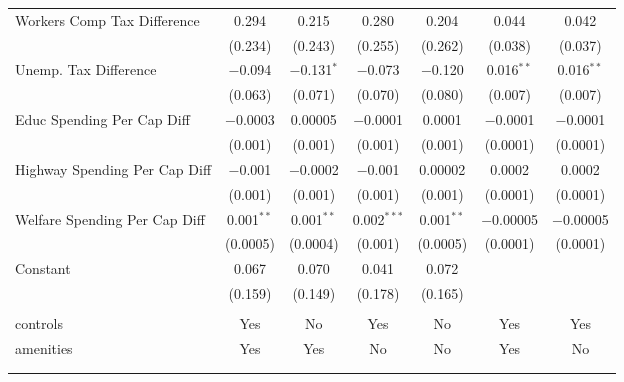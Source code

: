 \begin{table}[!htbp]
\begin{tabular}{@{\extracolsep{5pt}}lcccccc}
  Workers Comp Tax Difference & 0.294 & 0.215 & 0.280 & 0.204 & 0.044 & 0.042 \\ 
  & (0.234) & (0.243) & (0.255) & (0.262) & (0.038) & (0.037) \\ 
  Unemp. Tax Difference & $-$0.094 & $-$0.131$^{*}$ & $-$0.073 & $-$0.120 & 0.016$^{**}$ & 0.016$^{**}$ \\ 
  & (0.063) & (0.071) & (0.070) & (0.080) & (0.007) & (0.007) \\ 
  Educ Spending Per Cap Diff & $-$0.0003 & 0.00005 & $-$0.0001 & 0.0001 & $-$0.0001 & $-$0.0001 \\ 
  & (0.001) & (0.001) & (0.001) & (0.001) & (0.0001) & (0.0001) \\ 
  Highway Spending Per Cap Diff & $-$0.001 & $-$0.0002 & $-$0.001 & 0.00002 & 0.0002 & 0.0002 \\ 
  & (0.001) & (0.001) & (0.001) & (0.001) & (0.0001) & (0.0001) \\ 
  Welfare Spending Per Cap Diff & 0.001$^{**}$ & 0.001$^{**}$ & 0.002$^{***}$ & 0.001$^{**}$ & $-$0.00005 & $-$0.00005 \\ 
  & (0.0005) & (0.0004) & (0.001) & (0.0005) & (0.0001) & (0.0001) \\ 
  Constant & 0.067 & 0.070 & 0.041 & 0.072 &  &  \\ 
  & (0.159) & (0.149) & (0.178) & (0.165) &  &  \\ 
 \hline \\[-1.8ex] 
controls & Yes & No & Yes & No & Yes & Yes \\ 
amenities & Yes & Yes & No & No & Yes & No \\ 
\hline \\[-1.8ex] 
\hline 
\hline \\[-1.8ex] 
\end{tabular} 
\end{table} 
